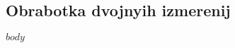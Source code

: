 \documentclass{article}
\begin{document}
\begin{center}
\section*{Obrabotka dvojnyih izmerenij}
\end{center}

\begin{landscape}

$body$

\end{landscape}
\end{document}
